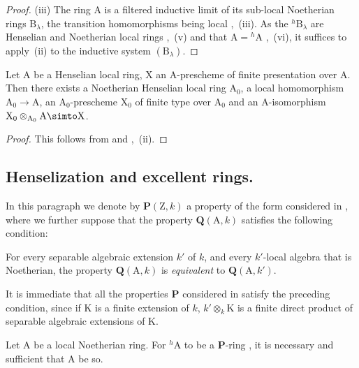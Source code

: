 \begin{proof}
(iii) The ring A is a filtered inductive limit of its sub-local Noetherian rings $\mathrm{B}_\lambda$, the transition homomorphisms being local ,~(iii).
As the ${}^h\!\mathrm{B}_\lambda$ are Henselian and Noetherian local rings ,~(v) and that $\mathrm{A}={}^h\!\mathrm{A}$ ,~(vi), it suffices to apply~(ii) to the inductive system $(\mathrm{B}_\lambda)$.
\end{proof}

\begin{corollary}[18.6.15]
\label{IV.18.6.15}
Let $\mathrm{A}$ be a Henselian local ring, $\mathrm{X}$ an A-prescheme of finite presentation over $\mathrm{A}$.
Then there exists a Noetherian Henselian local ring $\mathrm{A}_0$, a local homomorphism $\mathrm{A}_0\to\mathrm{A}$, an $\mathrm{A}_0$-prescheme $\mathrm{X}_0$ of finite type over $\mathrm{A}_0$ and an A-isomorphism $\mathrm{X}_0\otimes_{\mathrm{A}_0}\mathrm{A}\simto\mathrm{X}$.
\end{corollary}

\begin{proof}
This follows from  and ,~(ii).
\end{proof}


\subsection{Henselization and excellent rings.}
\label{subsection:IV.18.7}

\begin{env}[18.7.1]
\label{IV.18.7.1}
In this paragraph we denote by $\boldsymbol{P}(\mathrm{Z},k)$ a property of the form considered in , where we further suppose that the property $\boldsymbol{Q}(\mathrm{A},k)$ satisfies the following condition:

For every separable algebraic extension $k'$ of $k$, and every $k'$-local algebra that is Noetherian, the property $\boldsymbol{Q}(\mathrm{A},k)$ is \emph{equivalent} to $\boldsymbol{Q}(\mathrm{A},k')$.

It is immediate that all the properties $\boldsymbol{P}$ considered in  satisfy the preceding condition, since if K is a finite extension of $k$, $k'\otimes_k\mathrm{K}$ is a finite direct product of separable algebraic extensions of K.
\end{env}

\begin{proposition}[18.7.2]
\label{IV.18.7.2}
Let $\mathrm{A}$ be a local Noetherian ring.
For ${}^h\!\mathrm{A}$ to be a $\boldsymbol{P}$-ring , it is necessary and sufficient that A be so.
\end{proposition}

